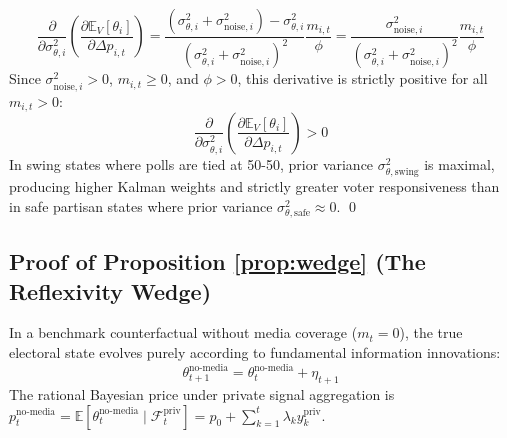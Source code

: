 \documentclass[12pt, a4paper]{article}
\begin{document}
\begin{equation}
\frac{\partial}{\partial \sigma_{\theta, i}^2} \left( \frac{\partial \mathbb{E}_V[\theta_i]}{\partial \Delta p_{i,t}} \right) = \frac{(\sigma_{\theta, i}^2 + \sigma_{\text{noise}, i}^2) - \sigma_{\theta, i}^2}{(\sigma_{\theta, i}^2 + \sigma_{\text{noise}, i}^2)^2} \frac{m_{i,t}}{\phi} = \frac{\sigma_{\text{noise}, i}^2}{(\sigma_{\theta, i}^2 + \sigma_{\text{noise}, i}^2)^2} \frac{m_{i,t}}{\phi}
\end{equation}
Since $\sigma_{\text{noise}, i}^2 > 0$, $m_{i,t} \ge 0$, and $\phi > 0$, this derivative is strictly positive for all $m_{i,t} > 0$:
\begin{equation}
\frac{\partial}{\partial \sigma_{\theta, i}^2} \left( \frac{\partial \mathbb{E}_V[\theta_i]}{\partial \Delta p_{i,t}} \right) > 0
\end{equation}
In swing states where polls are tied at 50-50, prior variance $\sigma_{\theta, \text{swing}}^2$ is maximal, producing higher Kalman weights and strictly greater voter responsiveness than in safe partisan states where prior variance $\sigma_{\theta, \text{safe}}^2 \approx 0$. \qed

\subsection{Proof of Proposition \ref{prop:wedge} (The Reflexivity Wedge)}
\label{app:proof_prop3}
In a benchmark counterfactual without media coverage ($m_t = 0$), the true electoral state evolves purely according to fundamental information innovations:
\begin{equation}
\theta_{t+1}^{\text{no-media}} = \theta_t^{\text{no-media}} + \eta_{t+1}
\end{equation}
The rational Bayesian price under private signal aggregation is $p_t^{\text{no-media}} = \mathbb{E}[\theta_t^{\text{no-media}} \mid \mathcal{F}_t^{\text{priv}}] = p_0 + \sum_{k=1}^t \lambda_k y_k^{\text{priv}}$.
\end{document}
